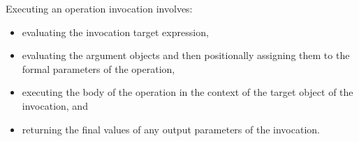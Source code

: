Executing an operation invocation involves:
\begin{itemize}
\item{} evaluating the invocation target expression,
\item{} evaluating the argument objects and then positionally
assigning them to the formal parameters of the operation,
\item{} executing the body of the operation in the
context of the target object of the invocation, and
\item{} returning the final values of any output parameters of the
invocation.
\end{itemize}
